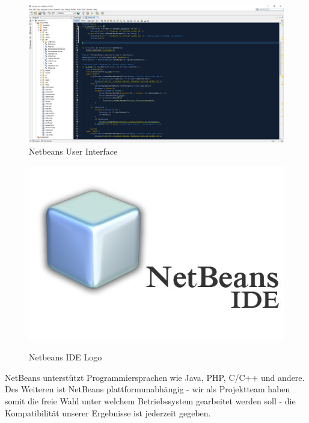 	\begin{figure}[h]
		\centering
		\includegraphics[scale=.3]{figures/netbeans_gui.png}
		\caption{Netbeans User Interface}
		\label{Netbeans_GUI}
	\end{figure}
	
	\begin{figure}
		\vspace{-1cm}
		\begin{center}
			\caption{Netbeans IDE Logo}
			\vspace{.5cm}
			\includegraphics[scale=.39]{figures/netbeans_logo.jpg}
			
			\label{Netbeans_Logo}
		\end{center}
	\end{figure}
	
	NetBeans unterstützt Programmiersprachen wie Java, PHP, C/C++ und andere. Des Weiteren ist NetBeans plattformunabhängig - wir als Projektteam haben somit die freie Wahl unter welchem Betriebssystem gearbeitet werden soll - die Kompatibilität unserer Ergebnisse ist jederzeit gegeben.
